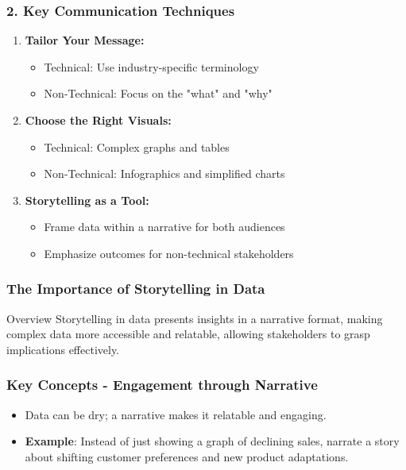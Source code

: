 \documentclass{beamer}
\begin{document}
\begin{frame}[fragile]
    \frametitle{2. Key Communication Techniques}
    \begin{enumerate}
        \item \textbf{Tailor Your Message:}
            \begin{itemize}
                \item Technical: Use industry-specific terminology 
                \item Non-Technical: Focus on the "what" and "why"
            \end{itemize}
        \item \textbf{Choose the Right Visuals:}
            \begin{itemize}
                \item Technical: Complex graphs and tables
                \item Non-Technical: Infographics and simplified charts
            \end{itemize}
        \item \textbf{Storytelling as a Tool:}
            \begin{itemize}
                \item Frame data within a narrative for both audiences
                \item Emphasize outcomes for non-technical stakeholders
            \end{itemize}
    \end{enumerate}
\end{frame}

\begin{frame}[fragile]
    \frametitle{The Importance of Storytelling in Data}
    \begin{block}{Overview}
        Storytelling in data presents insights in a narrative format, making complex data more accessible and relatable, allowing stakeholders to grasp implications effectively.
    \end{block}
\end{frame}

\begin{frame}[fragile]
    \frametitle{Key Concepts - Engagement through Narrative}
    \begin{itemize}
        \item Data can be dry; a narrative makes it relatable and engaging.
        \item \textbf{Example}: Instead of just showing a graph of declining sales, narrate a story about shifting customer preferences and new product adaptations.
    \end{itemize}
\end{frame}
\end{document}
